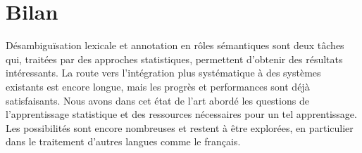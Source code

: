 %
%

\section{Bilan}

Désambiguïsation lexicale et annotation en rôles sémantiques sont deux tâches
qui, traitées par des approches statistiques, permettent d'obtenir des
résultats intéressants. La route vers l'intégration plus systématique à des
systèmes existants est encore longue, mais les progrès et performances sont
déjà satisfaisants. Nous avons dans cet état de l'art abordé les questions de
l'apprentissage statistique et des ressources nécessaires pour un tel
apprentissage. Les possibilités sont encore nombreuses et restent à être
explorées, en particulier dans le traitement d'autres langues comme le
français.

